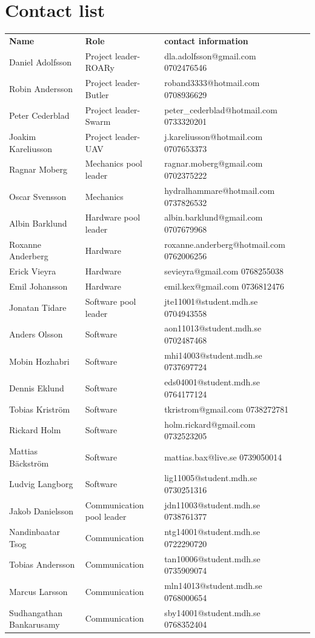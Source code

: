 \section{Contact list}
\begin{tabular}{l l p{5cm} l}
{\bf Name} & {\bf Role} & {\bf contact information}\\
Daniel Adolfsson & Project leader-ROARy & dla.adolfsson@gmail.com  0702476546\\
Robin Andersson & Project leader-Butler  & roband3333@hotmail.com  0708936629\\
Peter Cederblad &  Project leader-Swarm & peter\_cederblad@hotmail.com  0733320201\\
Joakim Kareliusson & Project leader-UAV  & j.kareliusson@hotmail.com  0707653373\\
Ragnar Moberg & Mechanics pool leader  & ragnar.moberg@gmail.com  0702375222\\
Oscar Svensson &  Mechanics & hydralhammare@hotmail.com  0737826532\\
Albin Barklund &  Hardware pool leader & albin.barklund@gmail.com  0707679968\\
Roxanne Anderberg &  Hardware & roxanne.anderberg@hotmail.com  0762006256\\
Erick Vieyra & Hardware  & sevieyra@gmail.com  0768255038\\
Emil Johansson &  Hardware & emil.kex@gmail.com  0736812476\\
Jonatan Tidare & Software pool leader  & jte11001@student.mdh.se   0704943558\\
Anders Olsson & Software  & aon11013@student.mdh.se  0702487468\\
Mobin Hozhabri &  Software & mhi14003@student.mdh.se  0737697724\\
Dennis Eklund & Software  & eds04001@student.mdh.se  0764177124\\
Tobias Kriström & Software  & tkristrom@gmail.com  0738272781\\
Rickard Holm &  Software & holm.rickard@gmail.com  0732523205\\
Mattias Bäckström &  Software & mattias.bax@live.se  0739050014\\
Ludvig Langborg &  Software & lig11005@student.mdh.se  0730251316\\
Jakob Danielsson & Communication pool leader  & jdn11003@student.mdh.se  0738761377\\
Nandinbaatar Tsog & Communication  & ntg14001@student.mdh.se  0722290720\\
Tobias Andersson &  Communication &  tan10006@student.mdh.se  0735909074\\
Marcus Larsson & Communication  & mln14013@student.mdh.se  0768000654\\
Sudhangathan Bankarusamy & Communication  & sby14001@student.mdh.se  0768352404\\
	
\end{tabular}









